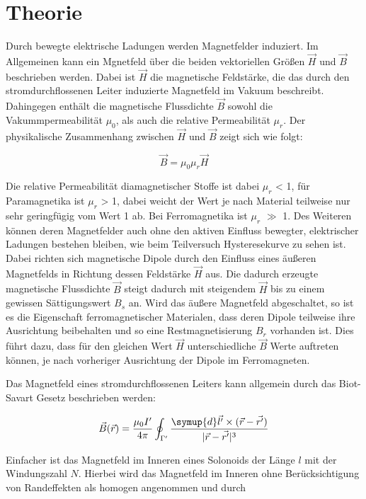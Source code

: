 \section{Theorie}
\label{sec:Theorie}



Durch bewegte elektrische Ladungen werden Magnetfelder induziert.
Im Allgemeinen kann ein Mgnetfeld über die beiden vektoriellen Größen 
$\vec H$ und $\vec B$ beschrieben werden. Dabei ist $\vec H$ die 
magnetische Feldstärke, die das durch den stromdurchflossenen Leiter induzierte 
Magnetfeld im Vakuum beschreibt. Dahingegen enthält die magnetische Flussdichte
$\vec B$ sowohl die Vakummpermeabilität $\mu_0$, als auch die relative Permeabilität
$\mu_r$. Der physikalische Zusammenhang zwischen $\vec H$ und $\vec B$ zeigt sich wie folgt:

\begin{equation}
    \vec B = \mu_0 \mu_r \vec H
\end{equation}

Die relative Permeabilität diamagnetischer Stoffe ist dabei $\mu_r$ < 1, für 
Paramagnetika ist $\mu_r$ > 1, dabei weicht der Wert je nach Material teilweise 
nur sehr geringfügig vom Wert 1 ab. Bei Ferromagnetika ist $\mu_r$ $\gg$ 1. Des Weiteren
können deren Magnetfelder auch ohne den aktiven Einfluss bewegter, elektrischer Ladungen
bestehen bleiben, wie beim Teilversuch Hysteresekurve zu sehen ist. Dabei richten sich 
magnetische Dipole durch den Einfluss 
eines äußeren Magnetfelds in Richtung dessen Feldstärke $\vec H$ aus. Die dadurch erzeugte magnetische
Flussdichte $\vec B$ steigt dadurch mit steigendem $\vec H$ bis zu einem gewissen Sättigungswert $B_s$
an. Wird das äußere Magnetfeld abgeschaltet, so ist es die Eigenschaft ferromagnetischer Materialen, dass
deren Dipole teilweise ihre Ausrichtung beibehalten und so eine Restmagnetisierung $B_r$ vorhanden ist.
Dies führt dazu, dass für den gleichen Wert $\vec H$ unterschiedliche $\vec B$ Werte auftreten können, je 
nach vorheriger Ausrichtung der Dipole im Ferromagneten. 


Das Magnetfeld eines stromdurchflossenen Leiters kann allgemein durch das Biot-Savart Gesetz
beschrieben werden:

\begin{equation}
    \vec{B}(\vec r) = \frac{\mu_0 I'}{4\pi} \oint_{\Gamma'} \frac{\symup{d}\vec{l'}\times (\vec{r}-\vec{r'})}{\lvert\vec{r}-\vec{r'}\rvert^3}
\end{equation}

Einfacher ist das Magnetfeld im Inneren eines Solonoids der Länge $l$ 
mit der Windungszahl $N$. Hierbei wird das Magnetfeld im Inneren ohne
Berücksichtigung von Randeffekten als homogen angenommen und durch 

